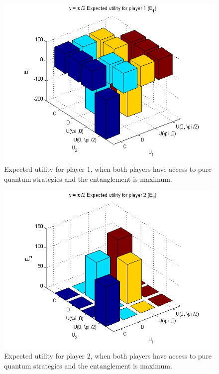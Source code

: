 \documentclass[10pt]{llncs}
\begin{document}
\begin{figure}[h!]
\centering 
\includegraphics[scale=0.50]{Figures/1.5qubit/p2_E1.png}
\caption{Expected utility for player $1$, when both players have access to pure quantum strategies and the entanglement is maximum. }
\label{fig:pg_2players_99_0_1:1}
\end{figure}

\begin{figure}[h!]
\centering 
\includegraphics[scale=0.50]{Figures/1.5qubit/P2_E2.png}
\caption{Expected utility for player $2$, when both players have access to pure quantum strategies and the entanglement is maximum. }
\label{fig:pg_2players_99_0_1:2}
\end{figure}
\end{document}

